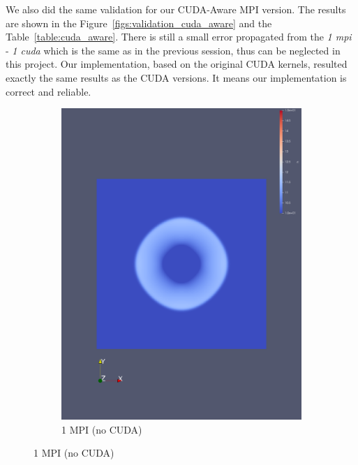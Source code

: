 \documentclass[article]{scrartcl}
\begin{document}
We also did the same validation for our CUDA-Aware MPI version. The results are shown in the Figure~\ref{figs:validation_cuda_aware} and the Table~\ref{table:cuda_aware}. There is still a small error propagated from the \textit{1 mpi} - \textit{1 cuda} which is the same as in the previous session, thus can be neglected in this project. Our implementation, based on the original CUDA kernels, resulted exactly the same results as the CUDA versions. It means our implementation is correct and reliable. 
\begin{figure}[htpb]
    \centering
    \begin{subfigure}{.3\textwidth}
        \includegraphics[width=\textwidth,keepaspectratio=true]{../figs/1_validation_cuda_original_1mpi.png}
        \caption{1 MPI (no CUDA)}
        \label{fig:1mpi_2nd}
    \end{subfigure}

\end{figure}
\end{document}
